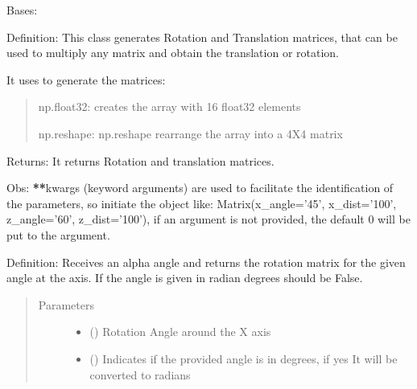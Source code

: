 \documentclass[letterpaper,10pt,english]{sphinxmanual}
\begin{document}
\begin{fulllineitems}
\label{\detokenize{rst/MatrixManipulation:MatrixManipulation.Matrix}}
Bases: 

Definition: This class generates Rotation and Translation matrices,
that can be used to multiply any matrix and obtain the translation or rotation.

It uses  to generate the matrices:
\begin{quote}

np.float32: creates the array with 16 float32 elements

np.reshape: np.reshape rearrange the array into a 4X4 matrix
\end{quote}

Returns: It returns Rotation and translation matrices.

Obs: {\color{red}\bfseries{}**}kwargs (keyword arguments) are used to facilitate the identification of the parameters, so initiate the
object
like: Matrix(x\_angle=’45’, x\_dist=’100’, z\_angle=’60’, z\_dist=’100’), if an argument is not provided,
the default 0 will be put to the argument.

\begin{fulllineitems}
\label{\detokenize{rst/MatrixManipulation:MatrixManipulation.Matrix.rot_x}}
Definition: Receives an alpha angle and returns the rotation matrix for the given angle at the  axis.
If the angle is given in radian degrees should be False.
\begin{quote}\begin{description}
\item[{Parameters}] \leavevmode\begin{itemize}
\item {} 
 () \textendash{} Rotation Angle around the X axis

\item {} 
 () \textendash{} Indicates if the provided angle is in degrees, if yes It will be converted to radians


\end{itemize}
\end{description}
\end{quote}
\end{fulllineitems}
\end{fulllineitems}
\end{document}
